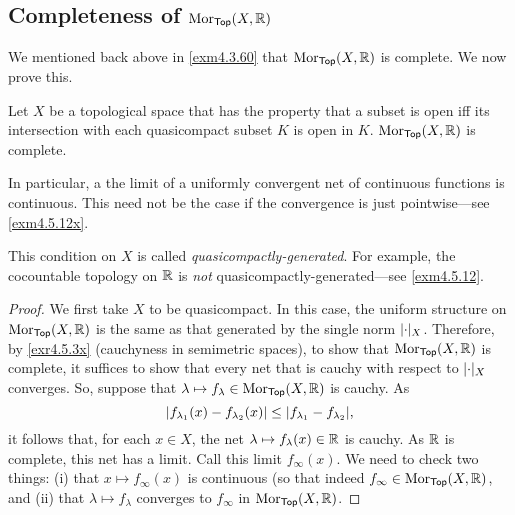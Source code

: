 \subsection{Completeness of $\operatorname{Mor} _{\mathsf{Top}}(X,\mathbb{R} )$}

We mentioned back above in \cref{exm4.3.60} that $\operatorname{Mor} _{\mathsf{Top}}(X,\mathbb{R} )$ is complete.  We now prove this.
\begin{thm}\label{thm4.5.6}
Let $X$ be a topological space that has the property that a subset is open iff its intersection with each quasicompact subset $K$ is open in $K$.  $\operatorname{Mor} _{\mathsf{Top}}(X,\mathbb{R} )$ is complete.
\begin{rmk}
In particular, a the limit of a uniformly convergent net of continuous functions is continuous.  This need not be the case if the convergence is just pointwise---see \cref{exm4.5.12x}.
\end{rmk}
\begin{rmk}
This condition on $X$ is called \emph{quasicompactly-generated}.  For example, the cocountable topology on $\mathbb{R}$ is \emph{not} quasicompactly-generated---see \cref{exm4.5.12}.
\end{rmk}
\begin{proof}
We first take $X$ to be quasicompact.  In this case, the uniform structure on $\operatorname{Mor} _{\mathsf{Top}}(X,\mathbb{R} )$ is the same as that generated by the single norm $\norm _X$.  Therefore, by \cref{exr4.5.3x} (cauchyness in semimetric spaces), to show that $\operatorname{Mor} _{\mathsf{Top}}(X,\mathbb{R} )$ is complete, it suffices to show that every net that is cauchy with respect to $\norm _X$ converges.  So, suppose that $\lambda \mapsto f_\lambda \in \operatorname{Mor} _{\mathsf{Top}}(X,\mathbb{R} )$ is cauchy.  As
\begin{equation}
\abs{f_{\lambda _1}(x)-f_{\lambda _2}(x)}\leq \norm[f_{\lambda _1}-f_{\lambda _2}],
\end{equation}
it follows that, for each $x\in X$, the net $\lambda \mapsto f_\lambda (x)\in \mathbb{R}$ is cauchy.  As $\mathbb{R}$ is complete, this net has a limit.  Call this limit $f_\infty (x)$.  We need to check two things:  (i) that $x\mapsto f_\infty (x)$ is continuous (so that indeed $f_\infty \in \operatorname{Mor} _{\mathsf{Top}}(X,\mathbb{R} )$, and (ii) that $\lambda \mapsto f_\lambda$ converges to $f_\infty$ in $\operatorname{Mor} _{\mathsf{Top}}(X,\mathbb{R} )$.


\end{proof}
\end{thm}
